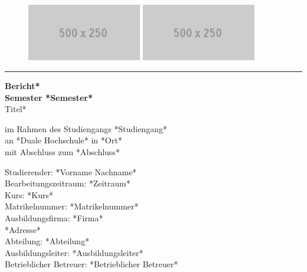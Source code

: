 \begin{titlepage}
 	\begin{figure}[h]
 	  	\begin{center}
	  	\begin{minipage}[b]{.2\linewidth}
	  		\includegraphics[width=5cm]{images/school.png}
		\end{minipage}
			\hspace{.48\linewidth}
		\begin{minipage}[b]{.3\linewidth}
	  		\includegraphics[width=5cm]{images/company.png}
		\end{minipage}
	  	\end{center}
	\end{figure}
	
	\hrule 
		
	\begin{center}
 	  \vspace*{2cm}
 	  \textbf{
 		\huge *Bericht*}\\
 		\vspace*{0.3cm}
 		\textbf{\Large Semester *Semester*}\\
 		\vspace*{1.5cm}
 		\large *Titel*

		\vspace*{1.0cm}
 		\large
 		im Rahmen des Studiengangs *Studiengang*\\
 		an *Duale Hochschule* in *Ort*\\
                  \vspace*{1.0cm}
 		\small mit Abschluss zum \linebreak
                   *Abschluss*
 	\end{center}
	
	\vfill
	 \begin{tabbing}
	 		\hspace*{1.5cm}\= Studierender: \hspace*{3.7cm}\= *Vorname Nachname* \\
			\> Bearbeitungszeitraum: \> *Zeitraum* \\
			\> Kurs: \> *Kurs* \\
			\> Matrikelnummer: \> *Matrikelnummer* \\
			\> Ausbildungsfirma: \> *Firma* \\ \> \> *Adresse* \\
			\> Abteilung: \> *Abteilung* \\
			\> Ausbildungsleiter: \> *Ausbildungsleiter* \\ 
			\> Betrieblicher Betreuer: \> *Betrieblicher Betreuer*
	 \end{tabbing}


\end{titlepage}
